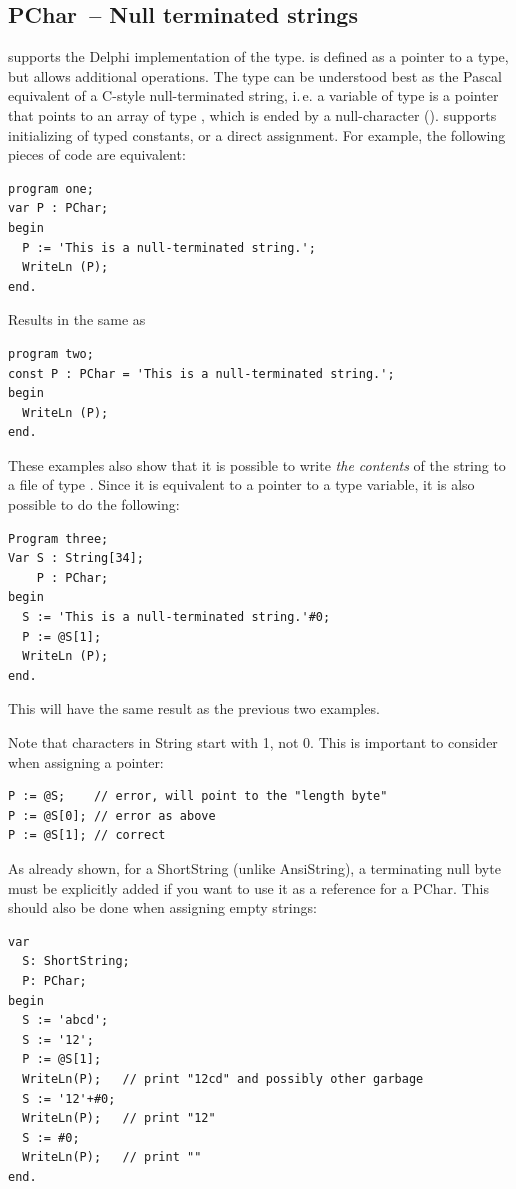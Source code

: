 \subsection{PChar~-- Null terminated strings}
 
\fpc supports the Delphi implementation of the  type. 
is defined as a pointer to a  type, but allows additional
operations.
The  type can be understood best as the Pascal equivalent of a
C-style null-terminated string, i.\,e. a variable of type  is a
pointer that points to an array of type , which is ended by a
null-character ().
\fpc supports initializing of  typed constants, or a direct
assignment. For example, the following pieces of code are equivalent:
\begin{verbatim}
program one;
var P : PChar;
begin
  P := 'This is a null-terminated string.';
  WriteLn (P);
end.
\end{verbatim}
Results in the same as
\begin{verbatim}
program two;
const P : PChar = 'This is a null-terminated string.';
begin
  WriteLn (P);
end.
\end{verbatim}
These examples also show that it is possible to write {\em the contents} of
the string to a file of type .
Since it is equivalent to a pointer to a type  variable, it  is
also possible to do the following:
\begin{verbatim}
Program three;
Var S : String[34];
    P : PChar;
begin
  S := 'This is a null-terminated string.'#0;
  P := @S[1];
  WriteLn (P);
end.
\end{verbatim}
This will have the same result as the previous two examples.

Note that characters in String start with 1, not 0.
This is important to consider when assigning a pointer:
\begin{verbatim}
P := @S;    // error, will point to the "length byte"
P := @S[0]; // error as above
P := @S[1]; // correct
\end{verbatim}

As already shown, for a ShortString (unlike AnsiString), a terminating null byte
must be explicitly added if you want to use it as a reference for a PChar.
This should also be done when assigning empty strings:
\begin{verbatim}
var
  S: ShortString;
  P: PChar;
begin
  S := 'abcd';
  S := '12';
  P := @S[1];
  WriteLn(P);   // print "12cd" and possibly other garbage
  S := '12'+#0;
  WriteLn(P);   // print "12"
  S := #0;
  WriteLn(P);   // print ""
end.
\end{verbatim}

